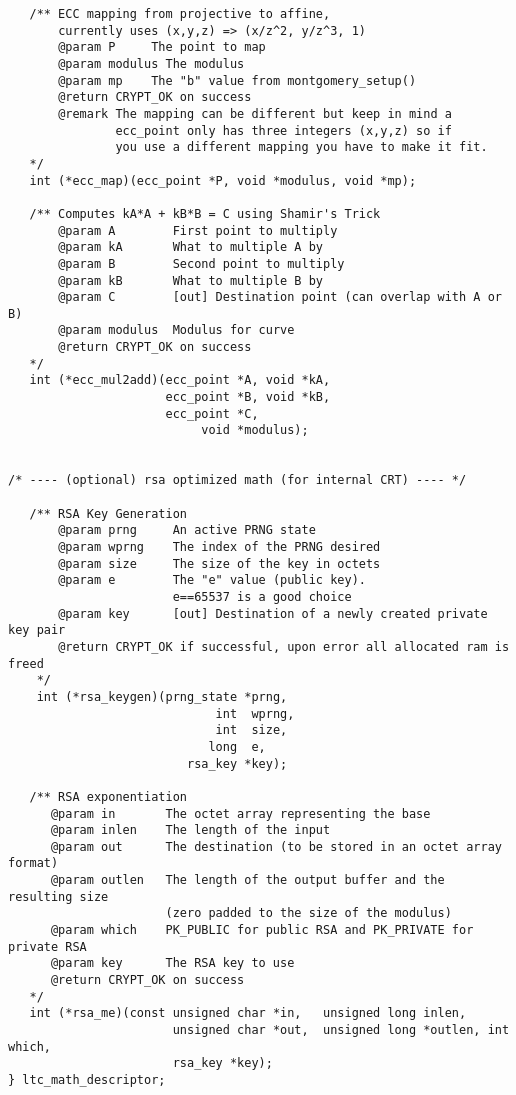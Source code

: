\documentclass[synpaper]{book}
\begin{document}
\begin{small}
\begin{verbatim}
   /** ECC mapping from projective to affine, 
       currently uses (x,y,z) => (x/z^2, y/z^3, 1)
       @param P     The point to map
       @param modulus The modulus
       @param mp    The "b" value from montgomery_setup()
       @return CRYPT_OK on success
       @remark The mapping can be different but keep in mind a 
               ecc_point only has three integers (x,y,z) so if 
               you use a different mapping you have to make it fit.
   */
   int (*ecc_map)(ecc_point *P, void *modulus, void *mp);

   /** Computes kA*A + kB*B = C using Shamir's Trick
       @param A        First point to multiply
       @param kA       What to multiple A by
       @param B        Second point to multiply
       @param kB       What to multiple B by
       @param C        [out] Destination point (can overlap with A or B)
       @param modulus  Modulus for curve 
       @return CRYPT_OK on success
   */ 
   int (*ecc_mul2add)(ecc_point *A, void *kA,
                      ecc_point *B, void *kB,
                      ecc_point *C,
                           void *modulus);


/* ---- (optional) rsa optimized math (for internal CRT) ---- */

   /** RSA Key Generation 
       @param prng     An active PRNG state
       @param wprng    The index of the PRNG desired
       @param size     The size of the key in octets
       @param e        The "e" value (public key).  
                       e==65537 is a good choice
       @param key      [out] Destination of a newly created private key pair
       @return CRYPT_OK if successful, upon error all allocated ram is freed
    */
    int (*rsa_keygen)(prng_state *prng, 
                             int  wprng, 
                             int  size, 
                            long  e, 
                         rsa_key *key);

   /** RSA exponentiation
      @param in       The octet array representing the base
      @param inlen    The length of the input
      @param out      The destination (to be stored in an octet array format)
      @param outlen   The length of the output buffer and the resulting size 
                      (zero padded to the size of the modulus)
      @param which    PK_PUBLIC for public RSA and PK_PRIVATE for private RSA
      @param key      The RSA key to use 
      @return CRYPT_OK on success
   */
   int (*rsa_me)(const unsigned char *in,   unsigned long inlen,
                       unsigned char *out,  unsigned long *outlen, int which,
                       rsa_key *key);
} ltc_math_descriptor;
\end{verbatim}
\end{small}
\end{document}
